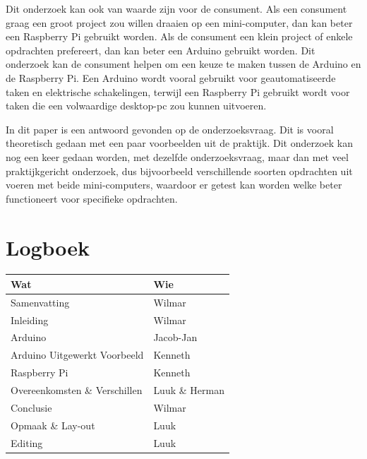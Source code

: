 \documentclass[a4paper, dutch, abstract=true]{scrartcl}
\begin{document}
Dit onderzoek kan ook van waarde zijn voor de consument.
Als een consument graag een groot project zou willen draaien op een mini-computer, dan kan beter een
Raspberry Pi gebruikt worden.
Als de consument een klein project of enkele opdrachten prefereert, dan kan beter een Arduino
gebruikt worden.
Dit onderzoek kan de consument helpen om een keuze te maken tussen de Arduino en de Raspberry Pi.
Een Arduino wordt vooral gebruikt voor geautomatiseerde taken en elektrische schakelingen, terwijl
een Raspberry Pi gebruikt wordt voor taken die een volwaardige desktop-pc zou kunnen uitvoeren.

In dit paper is een antwoord gevonden op de onderzoeksvraag.
Dit is vooral theoretisch gedaan met een paar voorbeelden uit de praktijk.
Dit onderzoek kan nog een keer gedaan worden, met dezelfde onderzoeksvraag, maar dan met veel
praktijkgericht onderzoek, dus bijvoorbeeld verschillende soorten opdrachten uit voeren met beide
mini-computers, waardoor er getest kan worden welke beter functioneert voor specifieke opdrachten.

\printbibliography

\section{Logboek}
\begin{tabular}{ll}
    \textbf{Wat}                  & \textbf{Wie}   \\
    \hline
    Samenvatting                  & Wilmar         \\
    Inleiding                     & Wilmar         \\
    Arduino                       & Jacob-Jan      \\
    Arduino Uitgewerkt Voorbeeld  & Kenneth        \\
    Raspberry Pi                  & Kenneth        \\
    Overeenkomsten \& Verschillen & Luuk \& Herman \\
    Conclusie                     & Wilmar         \\
    \hline
    Opmaak \& Lay-out             & Luuk           \\
    Editing                       & Luuk
\end{tabular}
\end{document}
